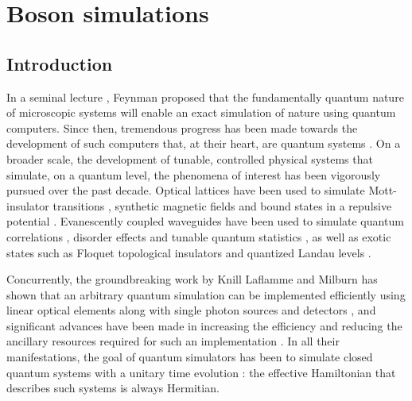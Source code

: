 \chapter{Boson simulations}
\label{ch:Simulations}

\section{Introduction}
\label{sec:SimIntro}
In a seminal lecture \cite{qsim-feynman}, Feynman proposed that the
fundamentally quantum nature of microscopic systems will enable an exact
simulation of nature using quantum computers. Since then, tremendous progress
has been made towards the development of such computers that, at their heart,
are quantum systems \cite{qcomp-review}. On a broader scale, the
development of tunable, controlled physical systems that simulate, on a quantum
level, the phenomena of interest has been vigorously pursued over the past
decade. Optical lattices have been used to simulate Mott-insulator transitions
\cite{jordens-nature-455-204}, synthetic magnetic fields
\cite{lin-nature-462-628} and bound states in a repulsive potential
\cite{winkler-nature-441-853}. Evanescently coupled waveguides
\cite{garanovich-waveguides-2012} have been used to simulate quantum
correlations \cite{walks-peruzzo}, disorder effects
\cite{crespi-nphoton-7-322} and tunable quantum statistics
\cite{matthews-scirep-3-1539}, as well as exotic states such as Floquet
topological insulators \cite{rechtsman-nature-496-196,
khanikaev-natmater-12-233} and quantized Landau levels
\cite{rechtsman-nphoton-7-153}.

Concurrently, the groundbreaking work by Knill Laflamme and Milburn
\cite{klm} has shown that an arbitrary quantum simulation can be
implemented efficiently using linear optical elements along with single photon
sources and detectors \cite{kok-revmodphys-79-135}, and significant advances
have been made in increasing the efficiency and reducing the ancillary resources
required for such an implementation \cite{review-obrien,
obrien-natphoton-3-687}. In all their manifestations, the goal of quantum
simulators has been to simulate closed quantum systems with a unitary time
evolution \cite{cirac-natphys-8-264}: the effective Hamiltonian that describes
such systems is always Hermitian.

